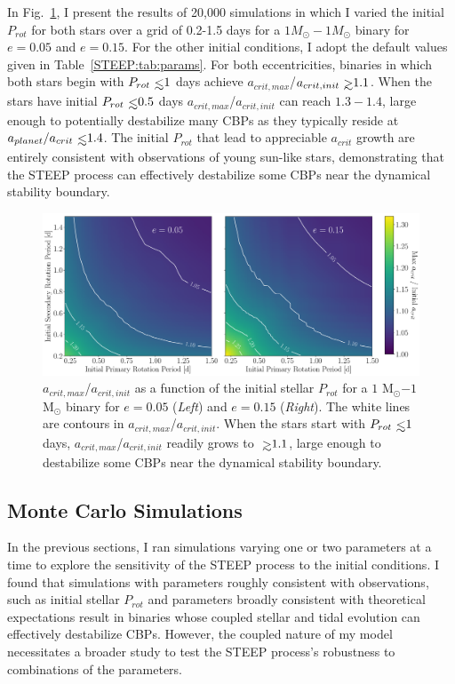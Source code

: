 In Fig.~\ref{STEEP:fig:GG_contour}, I present the results of 20,000 simulations in which I varied the initial $P_{rot}$ for both stars over a grid of 0.2-1.5 days for a $1 M_{\odot} - 1 M_{\odot}$ binary for $e=0.05$ and $e=0.15$.  For the other initial conditions, I adopt the default values given in Table~\ref{STEEP:tab:params}.  For both eccentricities, binaries in which both stars begin with $P_{rot} \lsim 1$ days achieve $a_{crit,max}$/$a_{crit,init} \gsim 1.1$.  When the stars have initial $P_{rot} \lsim 0.5$ days $a_{crit,max}$/$a_{crit,init}$ can reach $1.3-1.4$, large enough to potentially destabilize many \kepler CBPs as they typically reside at $a_{planet}/a_{crit} \lsim 1.4$.  The initial $P_{rot}$ that lead to appreciable $a_{crit}$ growth are entirely consistent with observations of young sun-like stars, demonstrating that the STEEP process can effectively destabilize some CBPs near the dynamical stability boundary.

\begin{figure}
	\includegraphics[width=\columnwidth]{GG_contour.pdf}
    \caption{$a_{crit,max}$/$a_{crit,init}$ as a function of the initial stellar $P_{rot}$ for a $1$ M$_{\odot}$$-1$ M$_{\odot}$ binary for $e = 0.05$ ({\it Left}) and $e = 0.15$ ({\it Right}).  The white lines are contours in $a_{crit,max}$/$a_{crit,init}$.  When the stars start with $P_{rot} \lsim 1$ days, $a_{crit,max}$/$a_{crit,init}$ readily grows to $\gsim 1.1$, large enough to destabilize some CBPs near the dynamical stability boundary.}
    \label{STEEP:fig:GG_contour}
\end{figure}

\subsection{Monte Carlo Simulations} \label{STEEP:sec:monte_carlo}

In the previous sections, I ran simulations varying one or two parameters at a time to explore the sensitivity of the STEEP process to the initial conditions.  I found that simulations with parameters roughly consistent with observations, such as initial stellar $P_{rot}$ and parameters broadly consistent with theoretical expectations result in binaries whose coupled stellar and tidal evolution can effectively destabilize CBPs.  However, the coupled nature of my model necessitates a broader study to test the STEEP process's robustness to combinations of the parameters.


